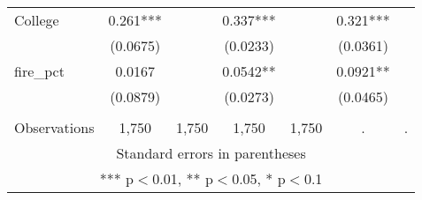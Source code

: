 \begin{tabular}{lcccccc}
College & 0.261*** &  & 0.337*** &  & 0.321*** &  \\
 & (0.0675) &  & (0.0233) &  & (0.0361) &  \\
fire\_pct & 0.0167 &  & 0.0542** &  & 0.0921** &  \\
 & (0.0879) &  & (0.0273) &  & (0.0465) &  \\
 &  &  &  &  &  &  \\
 Observations & 1,750 & 1,750 & 1,750 & 1,750 & . & . \\ \hline
\multicolumn{7}{c}{ Standard errors in parentheses} \\
\multicolumn{7}{c}{ *** p$<$0.01, ** p$<$0.05, * p$<$0.1} \\
\end{tabular}
